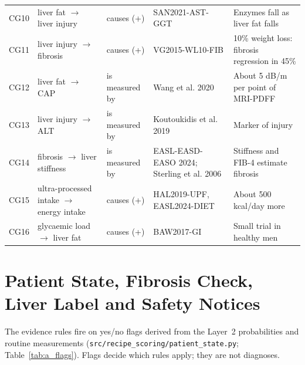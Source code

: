 \begin{table}[htbp]
\begin{tabularx}{\textwidth}{p{0.8cm}>{\raggedright\arraybackslash}p{4.4cm}>{\raggedright\arraybackslash}p{2.0cm}LL}
CG10 & liver fat $\rightarrow$ liver injury & causes (+) & SAN2021-AST-GGT & Enzymes fall as liver fat falls \\
CG11 & liver injury $\rightarrow$ fibrosis & causes (+) & VG2015-WL10-FIB & 10\% weight loss: fibrosis regression in 45\% \\
CG12 & liver fat $\rightarrow$ CAP & is measured by & Wang et al. 2020 & About 5 dB/m per point of MRI-PDFF \\
CG13 & liver injury $\rightarrow$ ALT & is measured by & Koutoukidis et al. 2019 & Marker of injury \\
CG14 & fibrosis $\rightarrow$ liver stiffness & is measured by & EASL-EASD-EASO 2024; Sterling et al. 2006 & Stiffness and FIB-4 estimate fibrosis \\
CG15 & ultra-processed intake $\rightarrow$ energy intake & causes (+) & HAL2019-UPF, EASL2024-DIET & About 500 kcal/day more \\
CG16 & glycaemic load $\rightarrow$ liver fat & causes (+) & BAW2017-GI & Small trial in healthy men \\
\bottomrule
\end{tabularx}
\end{table}

\section{Patient State, Fibrosis Check, Liver Label and Safety Notices}
\label{app:a_state}

The evidence rules fire on yes/no flags derived from the Layer~2
probabilities and routine measurements
(\nolinkurl{src/recipe_scoring/patient_state.py}; Table~\ref{tab:a_flags}).
Flags decide which rules apply; they are not diagnoses.


